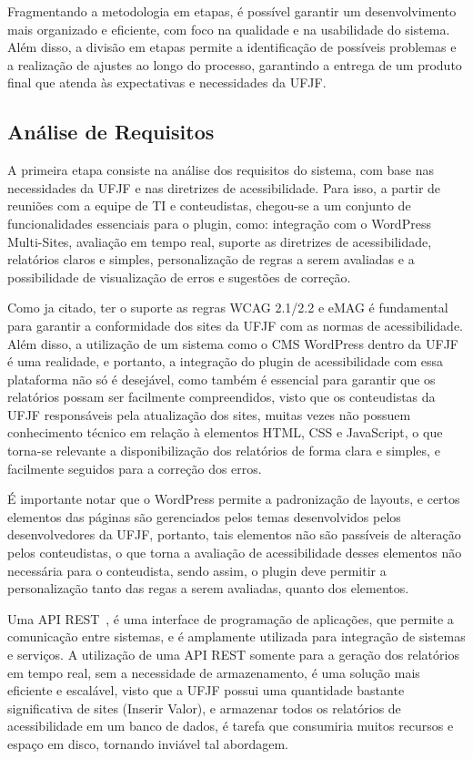 \documentclass[
	article,			%
	12pt,				%
	oneside,			%
	a4paper,			%
	section=TITLE,		%
	subsection=TITLE,	%
	english,			%
	brazil,				%
	sumario=tradicional
	]{abntex2}
\begin{document}
Fragmentando a metodologia em etapas, é possível garantir um desenvolvimento
mais organizado e eficiente, com foco na qualidade e na usabilidade do sistema.
Além disso, a divisão em etapas permite a identificação de possíveis problemas
e a realização de ajustes ao longo do processo, garantindo a entrega de um
produto final que atenda às expectativas e necessidades da UFJF\@.

\subsection{Análise de Requisitos}
A primeira etapa consiste na análise dos requisitos do sistema, com base nas
necessidades da UFJF e nas diretrizes de acessibilidade. Para isso, a partir
de reuniões com a equipe de TI e conteudistas, chegou-se a um conjunto de
funcionalidades essenciais para o plugin, como: integração com o WordPress
Multi-Sites, avaliação em tempo real, suporte as diretrizes de acessibilidade,
relatórios claros e simples, personalização de regras a serem avaliadas e a
possibilidade de visualização de erros e sugestões de correção.

Como ja citado, ter o suporte as regras WCAG 2.1/2.2 e eMAG é fundamental para
garantir a conformidade dos sites da UFJF com as normas de acessibilidade.
Além disso, a utilização de um sistema como o CMS WordPress dentro da UFJF
é uma realidade, e portanto, a integração do plugin de acessibilidade com
essa plataforma não só é desejável, como também é essencial para garantir
que os relatórios possam ser facilmente compreendidos, visto que os
conteudistas da UFJF responsáveis pela atualização dos sites, muitas
vezes não possuem conhecimento técnico em relação à elementos HTML,
CSS e JavaScript, o que torna-se relevante a disponibilização dos
relatórios de forma clara e simples, e facilmente seguidos para a
correção dos erros.

É importante notar que o WordPress permite a padronização de layouts,
e certos elementos das páginas são gerenciados pelos temas desenvolvidos pelos
desenvolvedores da UFJF, portanto, tais elementos não são passíveis de alteração
pelos conteudistas, o que torna a avaliação de acessibilidade desses elementos
não necessária para o conteudista, sendo assim, o plugin deve permitir a
personalização tanto das regas a serem avaliadas, quanto dos elementos.

Uma API REST~\cite{api}, é uma interface de programação de aplicações, que
permite a comunicação entre sistemas, e é amplamente utilizada para integração
de sistemas e serviços. A utilização de uma API REST somente para a geração
dos relatórios em tempo real, sem a necessidade de armazenamento, é uma
solução mais eficiente e escalável, visto que a UFJF possui uma quantidade
bastante significativa de sites (Inserir Valor), e armazenar todos os
relatórios de acessibilidade em um banco de dados, é tarefa que consumiria
muitos recursos e espaço em disco, tornando inviável tal abordagem.
\end{document}
